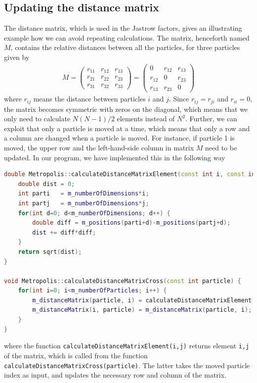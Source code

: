 \subsection{Updating the distance matrix} \label{sec:distancematrix}
The distance matrix, which is used in the Jastrow factors, gives an illustrating example how we can avoid repeating calculations. The matrix, henceforth named $M$, contains the relative distances between all the particles, for three particles given by
\begin{eqnarray}
M=
\begin{pmatrix}
r_{11} & r_{12} & r_{13} \\
r_{21} & r_{22} & r_{23} \\
r_{31} & r_{32} & r_{33}
\end{pmatrix}
=
\begin{pmatrix}
0 & r_{12} & r_{13} \\
r_{12} & 0 & r_{23} \\
r_{13} & r_{23} & 0
\end{pmatrix}
\end{eqnarray}
where $r_{ij}$ means the distance between particles $i$ and $j$. Since $r_{ij}=r_{ji}$ and $r_{ii}=0$, the matrix becomes symmetric with zeros on the diagonal, which means that we only need to calculate $N(N-1)/2$ elements instead of $N^2$. Further, we can exploit that only a particle is moved at a time, which means that only a row and a column are changed when a particle is moved. For instance, if particle 1 is moved, the upper row and the left-hand-side column in matrix $M$ need to be updated. In our program, we have implemented this in the following way
\lstset{basicstyle=\scriptsize}
\begin{lstlisting}[language=c++,caption={When a particle is moved, we update a row and a column in the distance matrix. The functions are parts of the Metropolis class, as the distance matrix is updated for every step in the Metropolis sampling. Taken from \lstinline{metropolis.cpp}.}]
double Metropolis::calculateDistanceMatrixElement(const int i, const int j) {
	double dist = 0;
	int parti   = m_numberOfDimensions*i;
	int partj   = m_numberOfDimensions*j;
	for(int d=0; d<m_numberOfDimensions; d++) {
		double diff = m_positions(parti+d)-m_positions(partj+d);
		dist += diff*diff;
	}
	return sqrt(dist);
}

void Metropolis::calculateDistanceMatrixCross(const int particle) {
	for(int i=0; i<m_numberOfParticles; i++) {
		m_distanceMatrix(particle, i) = calculateDistanceMatrixElement(particle, i);
		m_distanceMatrix(i, particle) = m_distanceMatrix(particle, i);
	}
}
\end{lstlisting}
where the function \lstinline{calculateDistanceMatrixElement(i,j)} returns element \lstinline{i,j} of the matrix, which is called from the function \lstinline{calculateDistanceMatrixCross(particle)}. The latter takes the moved particle index as input, and updates the necessary row and column of the matrix. 

